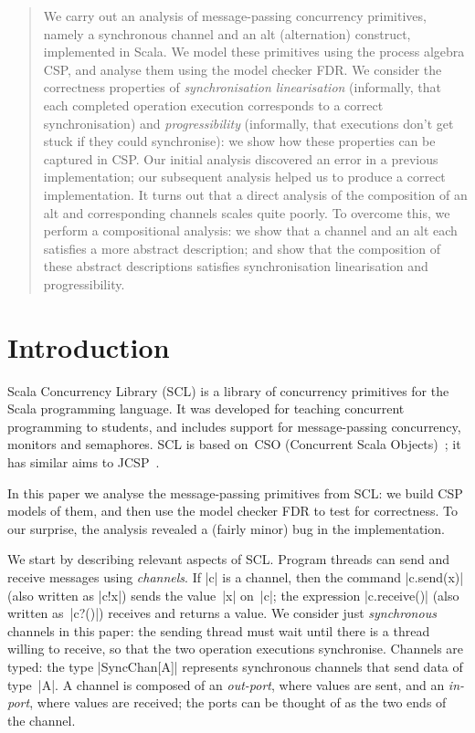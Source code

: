 \begin{abstract}
We carry out an analysis of message-passing concurrency primitives, namely a
synchronous channel and an alt (alternation) construct, implemented in Scala.
We model these primitives using the process algebra CSP, and analyse them
using the model checker FDR.  We consider the correctness properties of
\emph{synchronisation linearisation} (informally, that each completed
operation execution corresponds to a correct synchronisation) and
\emph{progressibility} (informally, that executions don't get stuck if they
could synchronise): we show how these properties can be captured in CSP\@.
Our initial analysis discovered an error in a previous implementation; our
subsequent analysis helped us to produce a correct implementation.  It turns
out that a direct analysis of the composition of an alt and corresponding
channels scales quite poorly.  To overcome this, we perform a compositional
analysis: we show that a channel and an alt each satisfies a more abstract
description; and show that the composition of these abstract descriptions
satisfies synchronisation linearisation and progressibility.
\end{abstract}


\section{Introduction}

Scala Concurrency Library (SCL) is a library of concurrency primitives for the
Scala programming language.  It was developed for teaching concurrent
programming to students, and includes support for message-passing concurrency,
monitors and semaphores.  SCL is based on~CSO (Concurrent Scala
Objects)~\cite{CSO}; it has similar aims to JCSP~\cite{JCSP}.

In this paper we analyse the message-passing primitives from SCL: we build CSP
models of them, and then use the model checker FDR to test for correctness.
To our surprise, the analysis revealed a (fairly minor) bug in the
implementation.

We start by describing relevant aspects of SCL\@.  Program threads can send
and receive messages using \emph{channels}.  If |c| is a channel, then the
command |c.send(x)| (also written as |c!x|) sends the value~|x| on~|c|; the
expression |c.receive()| (also written as~|c?()|) receives and returns a
value.  We consider just \emph{synchronous} channels in this paper: the
sending thread must wait until there is a thread willing to receive, so that
the two operation executions synchronise.  Channels are typed: the type
|SyncChan[A]| represents synchronous channels that send data of type~|A|.  A
channel is composed of an \emph{out-port}, where values are sent, and an
\emph{in-port}, where values are received; the ports can be thought of as the
two ends of the channel.

